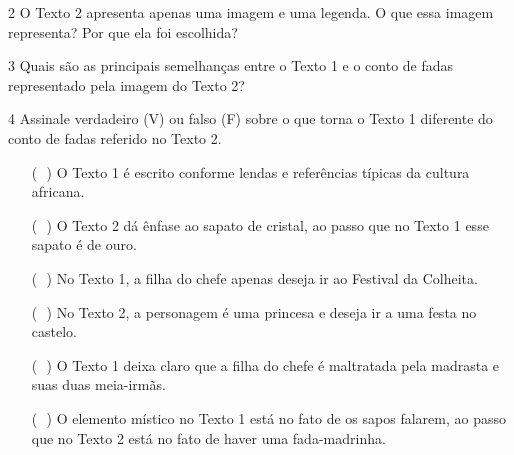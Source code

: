 \num{2} O Texto 2 apresenta apenas uma imagem e uma legenda. O que essa
imagem representa? Por que ela foi escolhida?


\num{3} Quais são as principais semelhanças entre o Texto 1 e o conto de
fadas representado pela imagem do Texto 2?


\num{4} Assinale verdadeiro (V) ou falso (F) sobre o que torna o Texto 1
diferente do conto de fadas referido no Texto 2.

\begin{itemize}
\item[(\,\,\,\,)] O Texto 1 é escrito conforme lendas e referências típicas da cultura
africana.
\item[(\,\,\,\,)] O Texto 2 dá ênfase ao sapato de cristal, ao passo que no Texto 1
esse sapato é de ouro.
\item[(\,\,\,\,)] No Texto 1, a filha do chefe apenas deseja ir ao Festival da
Colheita.
\item[(\,\,\,\,)] No Texto 2, a personagem é uma princesa e deseja ir a uma festa no
castelo.
\item[(\,\,\,\,)] O Texto 1 deixa claro que a filha do chefe é maltratada pela
madrasta e suas duas meia-irmãs.
\item[(\,\,\,\,)] O elemento místico no Texto 1 está no fato de os sapos falarem, ao
passo que no Texto 2 está no fato de haver uma fada-madrinha.
\end{itemize}

